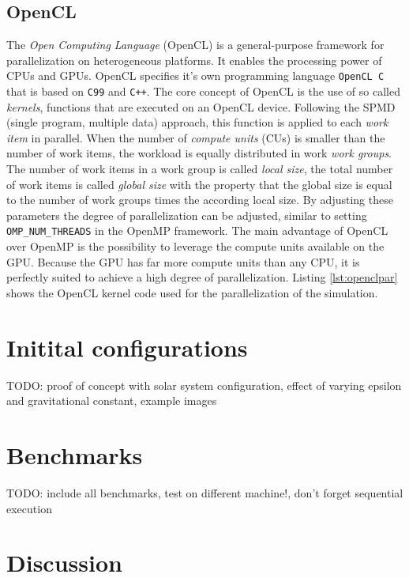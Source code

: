 \documentclass[a4paper,11pt]{scrartcl} %
\begin{document}


\subsection{OpenCL}
The \textit{Open Computing Language} (OpenCL) is a general-purpose framework for parallelization on heterogeneous platforms. It enables the processing power of CPUs and GPUs. OpenCL specifies it's own programming language \texttt{OpenCL C} that is based on \texttt{C99} and \texttt{C++}. The core concept of OpenCL is the use of so called \textit{kernels}, functions that are executed on an OpenCL device. Following the SPMD (single program, multiple data) approach, this function is applied to each \textit{work item} in parallel. When the number of \textit{compute units} (CUs) is smaller than the number of work items, the workload is equally distributed in work \textit{work groups}. The number of work items in a work group is called \textit{local size}, the total number of work items is called \textit{global size} with the property that the global size is equal to the number of work groups times the according local size. By adjusting these parameters the degree of parallelization can be adjusted, similar to setting \texttt{OMP\_NUM\_THREADS} in the OpenMP framework. The main advantage of OpenCL over OpenMP is the possibility to leverage the compute units available on the GPU. Because the GPU has far more compute units than any CPU, it is perfectly suited to achieve a high degree of parallelization. Listing \ref{lst:openclpar} shows the OpenCL kernel code used for the parallelization of the simulation.

\newpage


\section{Initital configurations}
TODO: proof of concept with solar system configuration, effect of varying epsilon and gravitational constant, example images

\section{Benchmarks}
TODO: include all benchmarks, test on different machine!, don't forget sequential execution

\section{Discussion}

{}

\end{document}
